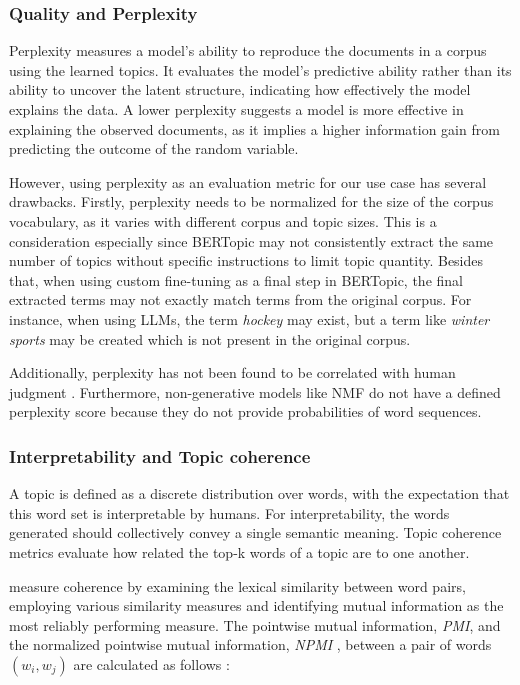 \subsubsection{Quality and Perplexity}

Perplexity measures a model's ability to reproduce the documents in a corpus using the learned topics. It evaluates the model's predictive ability rather than its ability to uncover the latent structure, indicating how effectively the model explains the data. A lower perplexity suggests a model is more effective in explaining the observed documents, as it implies a higher information gain from predicting the outcome of the random variable.

However, using perplexity as an evaluation metric for our use case has several drawbacks. Firstly, perplexity needs to be normalized for the size of the corpus vocabulary, as it varies with different corpus and topic sizes. This is a consideration especially since BERTopic may not consistently extract the same number of topics without specific instructions to limit topic quantity. Besides that, when using custom fine-tuning as a final step in BERTopic, the final extracted terms may not exactly match terms from the original corpus. For instance, when using LLMs, the term \textit{hockey} may exist, but a term like \textit{winter sports} may be created which is not present in the original corpus.

Additionally, perplexity has not been found to be correlated with human judgment \cite{chang_reading_2009}. Furthermore, non-generative models like NMF do not have a defined perplexity score because they do not provide probabilities of word sequences.

\subsubsection{Interpretability and Topic coherence}

A topic is defined as a discrete distribution over words, with the expectation that this word set is interpretable by humans. For interpretability, the words generated should collectively convey a single semantic meaning. Topic coherence metrics evaluate how related the top-k words of a topic are to one another.

\citet{newman_automatic_2010} measure coherence by examining the lexical similarity between word pairs, employing various similarity measures and identifying mutual information as the most reliably performing measure. The pointwise mutual information, \textit{PMI}, and the normalized pointwise mutual information, \textit{NPMI} \cite{bouma_normalized_nodate}, between a pair of words $(w_i, w_j)$ are calculated as follows \cite{lau_machine_2014}:

